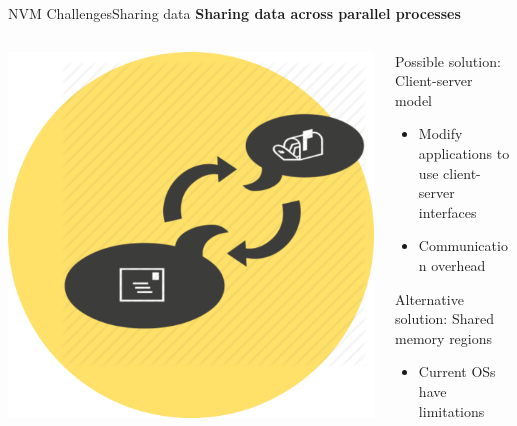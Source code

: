 \documentclass[10pt]{beamer}
\begin{document}
\begin{frame}{NVM Challenges}{Sharing data}
  \textbf{Sharing data across parallel processes}

  \begin{columns}[T]
    \begin{column}{.2\textwidth}
      \includegraphics[width=1.7\textwidth, keepaspectratio=true]{images/client_server.png}
    \end{column} \pause

    \hfill
    \begin{column}{.7\textwidth}
      Possible solution: Client-server model \pause
      \begin{itemize}
        \item Modify applications to use client-server interfaces \pause
        \item Communication overhead \pause
      \end{itemize}
      Alternative solution: Shared memory regions \pause
      \begin{itemize}
        \item Current OSs have limitations
      \end{itemize}
    \end{column}

  \end{columns}
\end{frame}
\end{document}
